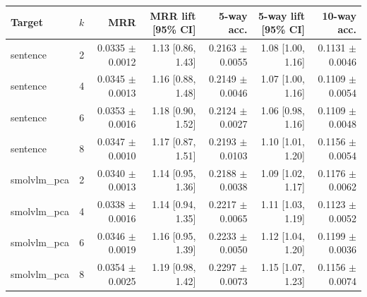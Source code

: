 \begin{tabular}{lrrrrrr}
Target & $k$ & MRR & MRR lift [95\% CI] & 5-way acc. & 5-way lift [95\% CI] & 10-way acc. \\
\hline
sentence & 2 & 0.0335 $\pm$ 0.0012 & 1.13 [0.86, 1.43] & 0.2163 $\pm$ 0.0055 & 1.08 [1.00, 1.16] & 0.1131 $\pm$ 0.0046 \\
sentence & 4 & 0.0345 $\pm$ 0.0013 & 1.16 [0.88, 1.48] & 0.2149 $\pm$ 0.0046 & 1.07 [1.00, 1.16] & 0.1109 $\pm$ 0.0054 \\
sentence & 6 & 0.0353 $\pm$ 0.0016 & 1.18 [0.90, 1.52] & 0.2124 $\pm$ 0.0027 & 1.06 [0.98, 1.16] & 0.1109 $\pm$ 0.0048 \\
sentence & 8 & 0.0347 $\pm$ 0.0010 & 1.17 [0.87, 1.51] & 0.2193 $\pm$ 0.0103 & 1.10 [1.01, 1.20] & 0.1156 $\pm$ 0.0054 \\
smolvlm\_pca & 2 & 0.0340 $\pm$ 0.0013 & 1.14 [0.95, 1.36] & 0.2188 $\pm$ 0.0038 & 1.09 [1.02, 1.17] & 0.1176 $\pm$ 0.0062 \\
smolvlm\_pca & 4 & 0.0338 $\pm$ 0.0016 & 1.14 [0.94, 1.35] & 0.2217 $\pm$ 0.0065 & 1.11 [1.03, 1.19] & 0.1123 $\pm$ 0.0052 \\
smolvlm\_pca & 6 & 0.0346 $\pm$ 0.0019 & 1.16 [0.95, 1.39] & 0.2233 $\pm$ 0.0050 & 1.12 [1.04, 1.20] & 0.1199 $\pm$ 0.0036 \\
smolvlm\_pca & 8 & 0.0354 $\pm$ 0.0025 & 1.19 [0.98, 1.42] & 0.2297 $\pm$ 0.0073 & 1.15 [1.07, 1.23] & 0.1156 $\pm$ 0.0074 \\
\end{tabular}
